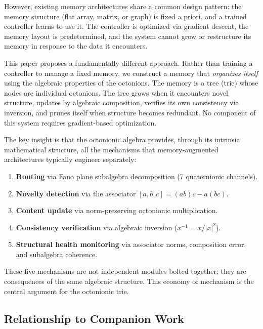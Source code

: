 \documentclass[11pt,a4paper]{article}
\theoremstyle{definition}
\theoremstyle{remark}
\begin{document}
However, existing memory architectures share a common design pattern: the memory structure (flat array, matrix, or graph) is fixed a priori, and a trained controller learns to use it. The controller is optimized via gradient descent, the memory layout is predetermined, and the system cannot grow or restructure its memory in response to the data it encounters.

This paper proposes a fundamentally different approach. Rather than training a controller to manage a fixed memory, we construct a memory that \emph{organizes itself} using the algebraic properties of the octonions. The memory is a tree (trie) whose nodes are individual octonions. The tree grows when it encounters novel structure, updates by algebraic composition, verifies its own consistency via inversion, and prunes itself when structure becomes redundant. No component of this system requires gradient-based optimization.

The key insight is that the octonionic algebra provides, through its intrinsic mathematical structure, all the mechanisms that memory-augmented architectures typically engineer separately:

\begin{enumerate}[nosep]
  \item \textbf{Routing} via Fano plane subalgebra decomposition (7 quaternionic channels).
  \item \textbf{Novelty detection} via the associator $[a,b,c] = (ab)c - a(bc)$.
  \item \textbf{Content update} via norm-preserving octonionic multiplication.
  \item \textbf{Consistency verification} via algebraic inversion ($x^{-1} = \bar{x}/\lvert x \rvert^2$).
  \item \textbf{Structural health monitoring} via associator norms, composition error, and subalgebra coherence.
\end{enumerate}

These five mechanisms are not independent modules bolted together; they are consequences of the same algebraic structure. This economy of mechanism is the central argument for the octonionic trie.

\subsection{Relationship to Companion Work}
\end{document}
